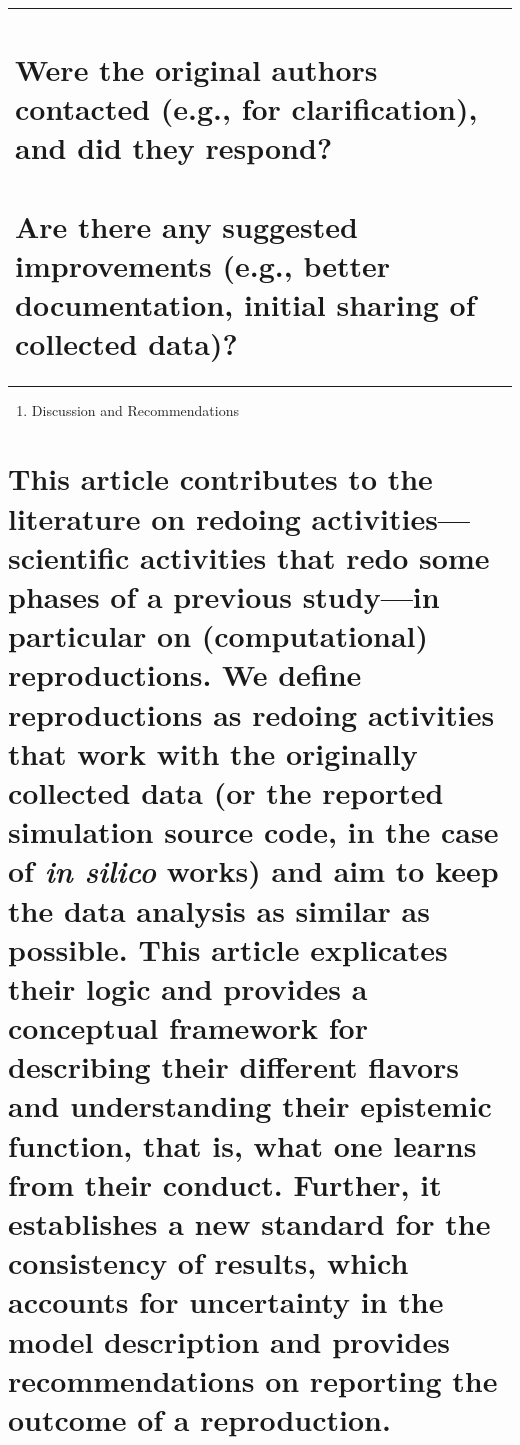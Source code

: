 \documentclass[authordate, empirical]{jote-new-article}
\begin{document}
\begin{table}
\begin{tabularx}{\linewidth}{@{} l @{}}
			\section{Were the original authors contacted (e.g., for clarification), and did they respond?}



			\section{Are there any suggested improvements (e.g., better documentation, initial sharing of collected data)?}

			 \\


		\end{tabularx}
	\end{table}
	\begin{enumerate}


		\item Discussion and Recommendations


	\end{enumerate}

	\section{This article contributes to the literature on redoing activities—scientific activities that redo some phases of a previous study—in particular on (computational) reproductions. We define reproductions as redoing activities that work with the originally collected data (or the reported simulation source code, in the case of \emph{in silico} works) and aim to keep the data analysis as similar as possible. This article explicates their logic and provides a conceptual framework for describing their different flavors and understanding their epistemic function, that is, what one learns from their conduct. Further, it establishes a new standard for the consistency of results, which accounts for uncertainty in the model description and provides recommendations on reporting the outcome of a reproduction.}
\end{document}
